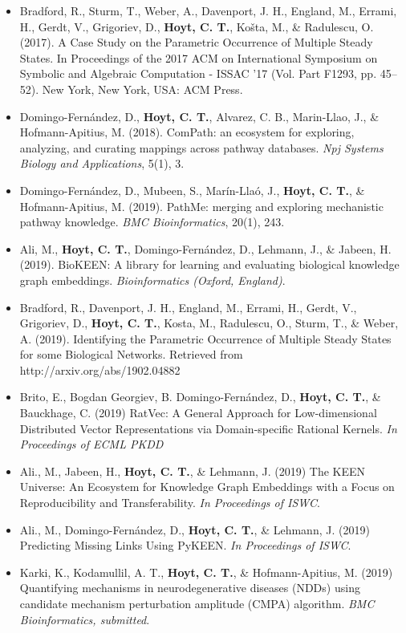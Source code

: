 \begin{itemize}
    \item Bradford, R., Sturm, T., Weber, A., Davenport, J. H., England, M., Errami, H., Gerdt, V., Grigoriev, D., \textbf{Hoyt, C. T.}, Košta, M., \& Radulescu, O. (2017). A Case Study on the Parametric Occurrence of Multiple Steady States. In Proceedings of the 2017 ACM on International Symposium on Symbolic and Algebraic Computation - ISSAC ’17 (Vol. Part F1293, pp. 45–52). New York, New York, USA: ACM Press.
    \item Domingo-Fern\'{a}ndez, D., \textbf{Hoyt, C. T.}, Alvarez, C. B., Marin-Llao, J., \& Hofmann-Apitius, M. (2018). ComPath: an ecosystem for exploring, analyzing, and curating mappings across pathway databases. \textit{Npj Systems Biology and Applications}, 5(1), 3.
    \item Domingo-Fern\'{a}ndez, D., Mubeen, S., Marín-Llaó, J., \textbf{Hoyt, C. T.}, \& Hofmann-Apitius, M. (2019). PathMe: merging and exploring mechanistic pathway knowledge. \textit{BMC Bioinformatics}, 20(1), 243.
    \item Ali, M., \textbf{Hoyt, C. T.}, Domingo-Fern\'{a}ndez, D., Lehmann, J., \& Jabeen, H. (2019). BioKEEN: A library for learning and evaluating biological knowledge graph embeddings. \textit{Bioinformatics (Oxford, England)}.
    \item Bradford, R., Davenport, J. H., England, M., Errami, H., Gerdt, V., Grigoriev, D., \textbf{Hoyt, C. T.}, Kosta, M., Radulescu, O., Sturm, T., \& Weber, A. (2019). Identifying the Parametric Occurrence of Multiple Steady States for some Biological Networks. Retrieved from http://arxiv.org/abs/1902.04882
    \item Brito, E., Bogdan Georgiev, B. Domingo-Fern\'{a}ndez, D., \textbf{Hoyt, C. T.}, \& Bauckhage, C. (2019) RatVec: A General Approach for Low-dimensional Distributed Vector Representations via Domain-specific Rational Kernels. \textit{In Proceedings of ECML PKDD}
    \item Ali., M., Jabeen, H., \textbf{Hoyt, C. T.}, \& Lehmann, J. (2019) The KEEN Universe: An Ecosystem for Knowledge Graph Embeddings with a Focus on Reproducibility and Transferability. \textit{In Proceedings of ISWC}.
    \item Ali., M., Domingo-Fern\'{a}ndez, D., \textbf{Hoyt, C. T.}, \& Lehmann, J. (2019) Predicting Missing Links Using PyKEEN. \textit{In Proceedings of ISWC}.
    \item Karki, K., Kodamullil, A. T., \textbf{Hoyt, C. T.}, \& Hofmann-Apitius, M. (2019) Quantifying mechanisms in neurodegenerative diseases (NDDs) using candidate mechanism perturbation amplitude (CMPA) algorithm. \textit{BMC Bioinformatics, submitted}.

\end{itemize}
